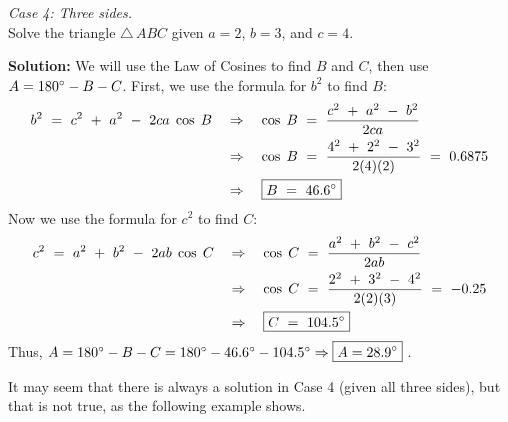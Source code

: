 \begin{exmp}\label{exmp:case4cosine}
\noindent \emph{Case 4: Three sides.}\\Solve the triangle $\triangle\,ABC$ given
 $a = 2$, $b = 3$, and $c = 4$.\vspace{1mm}
 \par\noindent\textbf{Solution:} We will use the Law of Cosines to find $B$ and $C$, then use
 $A = 180^\circ - B - C$. First, we use the formula for $b^2$ to find $B$:
 \begin{align*}
  b^2 ~ = ~ c^2 ~ + ~ a^2 ~ - ~ 2ca\;\cos\;B \quad&\Rightarrow\quad
  \cos\;B ~=~ \frac{c^2 ~ + ~ a^2 ~-~ b^2}{2ca}\\
  &\Rightarrow\quad \cos\;B ~=~ \frac{4^2 ~ + ~ 2^2 ~-~ 3^2}{2(4)(2)} ~=~ 0.6875\\
  &\Rightarrow\quad \boxed{B ~=~ 46.6^\circ}
 \end{align*}
 Now we use the formula for $c^2$ to find $C$:
 \begin{align*}
  c^2 ~ = ~ a^2 ~ + ~ b^2 ~ - ~ 2ab\;\cos\;C \quad&\Rightarrow\quad
  \cos\;C ~=~ \frac{a^2 ~ + ~ b^2 ~-~ c^2}{2ab}\\
  &\Rightarrow\quad \cos\;C ~=~ \frac{2^2 ~ + ~ 3^2 ~-~ 4^2}{2(2)(3)} ~=~ -0.25\\
  &\Rightarrow\quad \boxed{C ~=~ 104.5^\circ}
 \end{align*}
 Thus, $A = 180^\circ - B - C = 180^\circ - 46.6^\circ - 104.5^\circ \Rightarrow
 \boxed{A = 28.9^\circ}\;$.
\end{exmp}\vspace{-2mm}
\divider
\vspace{2mm}

It may seem that there is always a solution in Case 4 (given all three sides), but that is not
true, as the following example shows.

